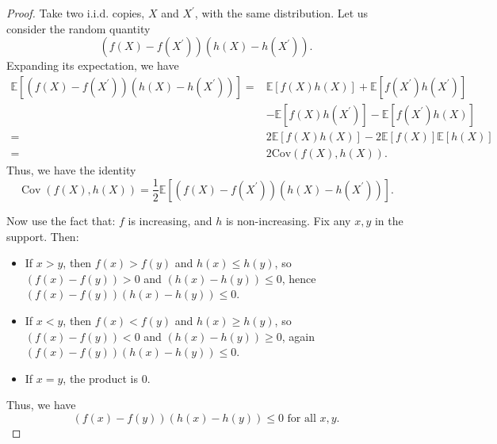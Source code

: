 \documentclass{article}
\theoremstyle{plain}
\theoremstyle{definition}
\theoremstyle{remark}
\def\nn{\nonumber \\ }
\begin{document}
\begin{proof}
    Take two i.i.d. copies, $X$ and $X^{\prime}$, with the same distribution. Let us consider the random quantity
    \begin{equation}
        \left(f(X)-f\left(X^{\prime}\right)\right)\left(h(X)-h\left(X^{\prime}\right)\right) .
    \end{equation}
    Expanding its expectation, we have
    \begin{align}
        \mathbb{E}\left[\left(f(X)-f\left(X^{\prime}\right)\right)\left(h(X)-h\left(X^{\prime}\right)\right)\right]
        = & \mathbb{E}[f(X) h(X)]+\mathbb{E}\left[f\left(X^{\prime}\right) h\left(X^{\prime}\right)\right] \nn
        & -  \mathbb{E}\left[f(X) h\left(X^{\prime}\right)\right]-\mathbb{E}\left[f\left(X^{\prime}\right) h(X)\right] \\
        = &2 \mathbb{E}[f(X) h(X)]-2 \mathbb{E}[f(X)] \mathbb{E}[h(X)] \\
        = &2 \mathrm{Cov}(f(X), h(X)) .
    \end{align}
    Thus, we have the identity
    \begin{equation}
        \operatorname{Cov}(f(X), h(X))=\frac{1}{2} \mathbb{E}\left[\left(f(X)-f\left(X^{\prime}\right)\right)\left(h(X)-h\left(X^{\prime}\right)\right)\right] . \label{eq:covariant_identity}
    \end{equation}
    
    Now use the fact that: $f$ is increasing, and $h$ is non-increasing.
    Fix any $x, y$ in the support. Then:
    \begin{itemize}
        \item If $x>y$, then $f(x)>f(y)$ and $h(x) \leq h(y)$, so $(f(x)-f(y))>0$ and $(h(x)-h(y)) \leq 0$, hence $(f(x)-f(y))(h(x)-h(y)) \leq 0$. 
        \item If $x<y$, then $f(x)<f(y)$ and $h(x) \geq h(y)$, so $(f(x)-f(y))<0$ and $(h(x)-h(y)) \geq 0$, again $(f(x)-f(y))(h(x)-h(y)) \leq 0$.
        \item If $x=y$, the product is $0$. 
    \end{itemize}
    Thus, we have
    \begin{equation}
        (f(x)-f(y))(h(x)-h(y)) \leq 0 \text { for all } x, y .
    \end{equation}
    

\end{proof}
\end{document}
